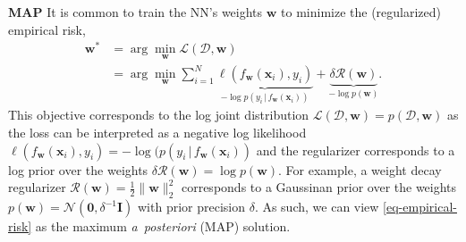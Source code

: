 \documentclass{article}
\newcommand{\dataset}{\ensuremath{\mathcal{D}}}
\newcommand{\inputDomain}{\ensuremath{\mathbb{R}^{D}}}
\newcommand{\outputDomain}{\ensuremath{\mathbb{R}^{C}}}
\newcommand{\weights}{\ensuremath{\mathbf{w}}}
\newcommand{\mbf}[1]{\mathbf{#1}}
\renewcommand{\mid}{\,|\,}
\newcommand{\MI}{\mbf{I}}
\newcommand{\vzeros}{\mbf{0}}
\newcommand{\vx}{\mbf{x}}
\newcommand{\vy}{\mbf{y}}
\newcommand{\vw}{\mbf{w}}
\newcommand{\Norm}{\mathcal{N}}
\begin{document}


\textbf{MAP}
It is common to train the NN's weights $\vw$ to minimize the (regularized) empirical risk,
%
\begin{align} \label{eq-empirical-risk}
  \weights^{*} &=
                 \arg \min_{\weights} \mathcal{L}(\dataset,\weights) \nonumber \\
               &=
  \arg \min_{\weights} \textstyle\sum_{i=1}^{N} \underbrace{\ell(f_\weights(\mathbf{x}_{i}), y_i)}_{-\log p(y_{i} \mid f_{\vw}(\vx_{i}))} + \underbrace{\delta \mathcal{R}(\weights)}_{-\log p(\vw)}.
\end{align}
%
This objective corresponds to the log joint distribution $\mathcal{L}(\mathcal{D},\vw)=p(\mathcal{D}, \vw)$
as the loss can be interpreted as a negative log likelihood $\ell(f_\weights(\vx_{i}), y_i) = -\log(p(y_{i} \mid f_\weights(\vx_{i}))$
and the regularizer corresponds to a log prior over the weights $\delta\mathcal{R}(\weights) = \log p(\vw)$.
For example, a weight decay regularizer $\mathcal{R}(\vw) = \frac{1}{2}\|\weights\|^{2}_2$ corresponds to a Gaussinan prior over the weights $p(\vw) = \Norm(\vzeros, \delta^{-1} \MI)$ with
prior precision $\delta$.
As such, we can view \cref{eq-empirical-risk} as the maximum {\it a~posteriori} (MAP) solution.

\end{document}
